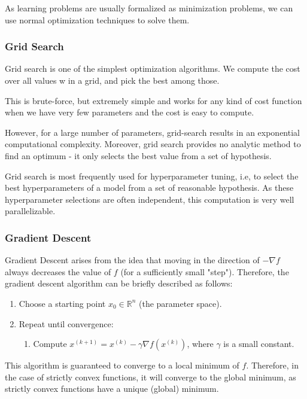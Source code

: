 \documentclass{article}
\newcommand{\R}{\mathbb{R}}
\begin{document}
As learning problems are usually formalized as minimization problems, we can use normal optimization techniques to solve them.

\subsubsection{Grid Search}

Grid search is one of the simplest optimization algorithms. 
We compute the cost over all values w in a grid, and pick the best among those.

This is brute-force, but extremely simple and works for any kind of cost function when we have very few parameters and the cost is easy to compute.

However, for a large number of parameters, grid-search results in an exponential computational complexity.
Moreover, grid search provides no analytic method to find an optimum - it only selects the best value from a set of hypothesis.

Grid search is most frequently used for hyperparameter tuning, i.e, to select the best hyperparameters of a model from a set of reasonable hypothesis.
As these hyperparameter selections are often independent, this computation is very well parallelizable.

\subsubsection{Gradient Descent} 

Gradient Descent arises from the idea that moving in the direction of $-\nabla f$ always decreases the value of $f$ (for a sufficiently small "step").
Therefore, the gradient descent algorithm can be briefly described as follows:
\begin{enumerate}
    \item Choose a starting point $x_0 \in \R^n$ (the parameter space).
    \item Repeat until convergence:
    \begin{enumerate}
	\item Compute $x^{(k+1)} = x^{(k)} - \gamma \nabla f(x^{(k)})$, where $\gamma$ is a small constant.
    \end{enumerate}
\end{enumerate}

This algorithm is guaranteed to converge to a local minimum of $f$.
Therefore, in the case of strictly convex functions, it will converge to the global minimum, as strictly convex functions have a unique (global) minimum.
\end{document}
